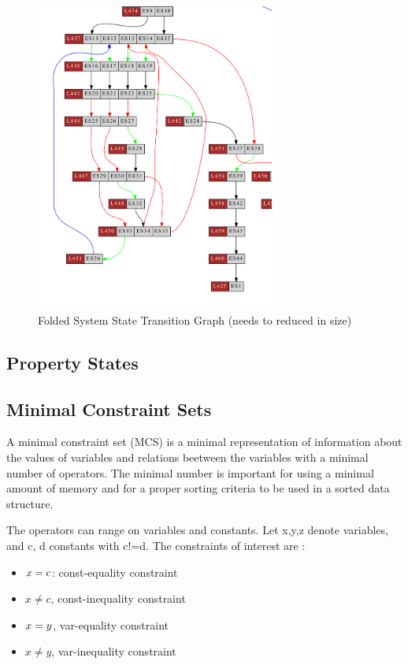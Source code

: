 \begin{figure}[t]
\centering
\includegraphics[width=0.7\textwidth]{gfx/basictest10f_transitiongraph2.pdf}
\caption{Folded System State Transition Graph (needs to reduced in size)}
\end{figure}

\clearpage
\subsection{Property States}


\subsection{Minimal Constraint Sets}
A minimal constraint set (MCS) is a minimal representation of
information about the values of variables and relations beetween the
variables with a minimal number of operators. The minimal number is
important for using a minimal amount of memory and for a proper
sorting criteria to be used in a sorted data structure.

The operators can range on variables and constants. Let x,y,z denote variables, and c, d constants with c!=d.
The constraints of interest are : 
\begin{itemize}
\item $x= c$: const-equality constraint
\item $x\neq c$, const-inequality constraint
\item $x= y$, var-equality constraint
\item $x\neq y$, var-inequality constraint
\end{itemize}

